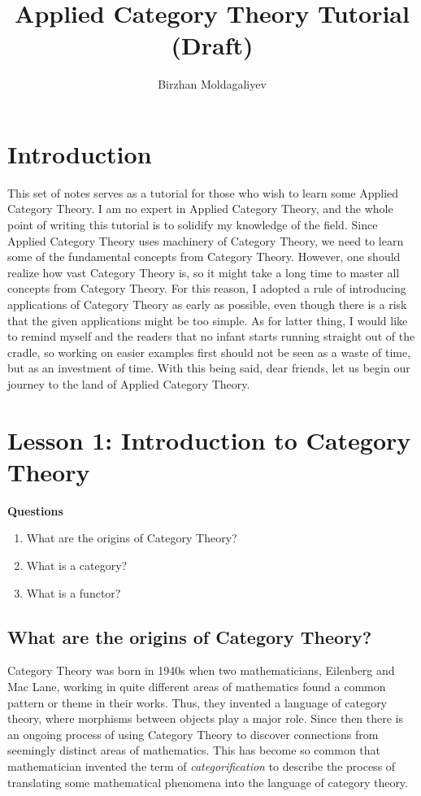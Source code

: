 \documentclass{report}
\author{Birzhan Moldagaliyev}
\title{Applied Category Theory Tutorial (Draft)}
\theoremstyle{definition}
\begin{document}
\maketitle
\chapter{Introduction}
This set of notes serves as a tutorial for those who wish to learn some Applied Category Theory. I am no expert in Applied Category Theory, and the whole point of writing this tutorial is to solidify my knowledge of the field. Since Applied Category Theory uses machinery of Category Theory, we need to learn some of the fundamental concepts from Category Theory. However, one should realize how vast Category Theory is, so it might take a long time to master all concepts from Category Theory. For  this reason, I adopted a rule of introducing applications of Category Theory as early as possible, even though there is a risk that the given applications might be too simple. As for latter thing, I would like to remind myself and the readers that no infant starts running straight out of the cradle, so working on easier examples first should not be seen as a waste of time, but as an investment of time. With this being said, dear friends, let us begin our journey to the land of Applied Category Theory.  

\chapter{Lesson 1: Introduction to Category Theory}
\textbf{Questions}\\
\begin{enumerate}
	\item What are the origins of Category Theory?
	\item What is a category?
	\item What is a functor?
\end{enumerate}


\section*{What are the origins of Category Theory?}
Category Theory was born in 1940s when two mathematicians, Eilenberg and Mac Lane, working in quite different areas of mathematics found a common pattern or theme in their works. Thus, they invented a language of category theory, where morphisms between objects play a major role. Since then there is an ongoing process of using Category Theory to discover connections from seemingly distinct areas of mathematics. This has become so common that mathematician invented the term of \emph{categorification} to describe the process of translating some mathematical phenomena into the language of category theory. 
\end{document}
